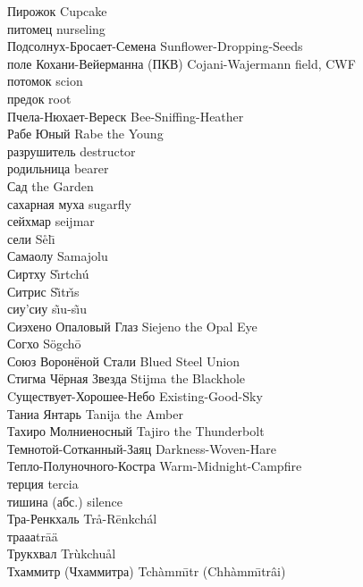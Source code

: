 \documentclass[a4paper,10pt]{book}
\newcommand{\ldotst}{\so{...}\xspace}
\begin{document}
Пирожок \hfill Cupcake\\
питомец \hfill nurseling\\
Подсолнух-Бросает-Семена \hfill Sunflower-Dropping-Seeds\\
поле Кохани-Вейерманна (ПКВ) \hfill Cojani-Wajermann field, CWF\\
потомок \hfill scion\\
предок \hfill root\\
Пчела-Нюхает-Вереск \hfill Bee-Sniffing-Heather\\
Рабе Юный \hfill Rabe the Young\\
разрушитель \hfill destructor\\
родильница \hfill bearer\\
Сад \hfill the Garden\\
сахарная муха \hfill sugarfly\\
сейхмар \hfill seijmar\\
сели \hfill S\r{e}l\={\i}\\
Самаолу \hfill Samajolu\\
Сиртху \hfill S\r{\i}rtch\'{u}\\
Ситрис \hfill S\~{\i}tr\v{\i}s\\
сиу'сиу \hfill s\~{\i}u-s\~{\i}u\\
Сиэхено Опаловый Глаз \hfill Siejeno the Opal Eye\\
Согхо \hfill S\"{o}gch\={o}\\
Союз Воронёной Стали \hfill Blued Steel Union\\
Стигма Чёрная Звезда \hfill Stijma the Blackhole\\
Cуществует-Хорошее-Небо \hfill Existing-Good-Sky\\
Таниа Янтарь \hfill Tanija the Amber\\
Тахиро Молниеносный \hfill Tajiro the Thunderbolt\\
Темнотой-Сотканный-Заяц \hfill Darkness-Woven-Hare\\
Тепло-Полуночного-Костра \hfill Warm-Midnight-Campfire\\
терция \hfill tercia\\
тишина (абс.) \hfill silence\\
Тра-Ренкхаль \hfill Tr\r{a}-R\={e}nkch\'{a}l\\
трааа\ldotst \hfill tr\={a}\"{a}\ldotst \\
Трукхвал \hfill Tr\`{u}kchu\r{a}l\\
Тхаммитр (Чхаммитра) \hfill Tch\`{a}mm\={\i}tr (Chh\`{a}mm\={\i}tr\^{a}i)\\
\end{document}
